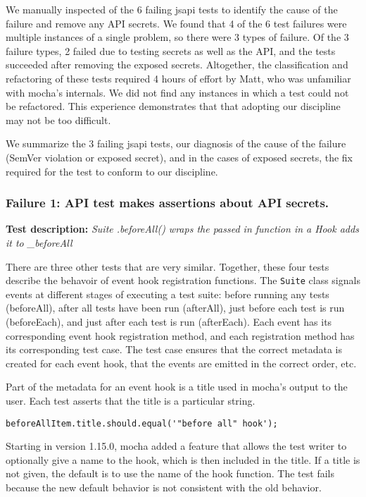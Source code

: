 We manually inspected of the 6 failing jsapi tests to identify the
cause of the failure and remove any API secrets. We found that 4 of
the 6 test failures were multiple instances of a single problem, so
there were 3 types of failure. Of the 3 failure types, 2 failed due to
testing secrets as well as the API, and the tests succeeded after
removing the exposed secrets. Altogether, the classification and
refactoring of these tests required 4 hours of effort by Matt, who was
unfamiliar with mocha's internals. We did not find any instances in
which a test could not be refactored. This experience demonstrates
that that adopting our discipline may not be too difficult.

We summarize the 3 failing jsapi tests, our diagnosis of the cause of
the failure (SemVer violation or exposed secret), and in the cases of
exposed secrets, the fix required for the test to conform to our
discipline.

\subsubsection{Failure 1: API test makes assertions about API secrets.}
{\bf Test description: } {\em Suite .beforeAll() wraps the passed in
function in a Hook adds it to \_beforeAll}

There are three other tests that are very similar. Together, these
four tests describe the behavoir of event hook registration
functions. The {\tt Suite} class signals events at different stages of
executing a test suite: before running any tests (beforeAll), after
all tests have been run (afterAll), just before each test is run
(beforeEach), and just after each test is run (afterEach). Each event
has its corresponding event hook registration method, and each
registration method has its corresponding test case. The test case
ensures that the correct metadata is created for each event hook, that
the events are emitted in the correct order, etc.

Part of the metadata for an event hook is a title used in mocha's
output to the user. Each test asserts that the title is a particular
string.

{\small
\begin{verbatim}
beforeAllItem.title.should.equal('"before all" hook');
\end{verbatim}
}

Starting in version 1.15.0, mocha added a feature that allows the test
writer to optionally give a name to the hook, which is then included
in the title. If a title is not given, the default is to use the name
of the hook function. The test fails because the new default behavior
is not consistent with the old behavior.

